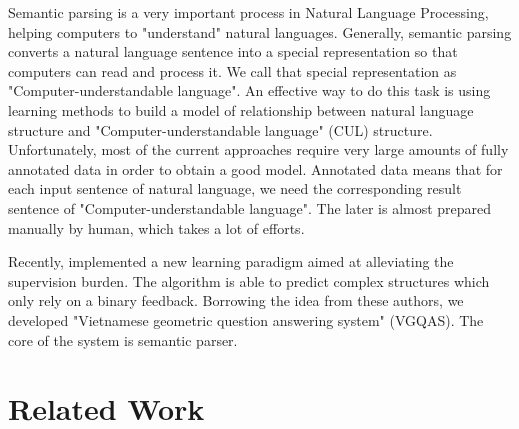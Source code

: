 \label{sec:introduction}

Semantic parsing is a very important process in Natural Language Processing, helping computers to "understand" natural languages. Generally, semantic parsing converts a natural language sentence into a special representation so that computers can read and process it. We call that special representation as "Computer-understandable language". An effective way to do this task is using learning methods to build a model of relationship between natural language structure and "Computer-understandable language" (CUL) structure. Unfortunately, most of the current approaches require very large amounts of fully annotated data in order to obtain a good model. Annotated data means that for each input sentence of natural language, we need the corresponding result sentence of "Computer-understandable language". The later is almost prepared manually by human, which takes a lot of efforts. 

Recently, \citeauthor{Clarke:2010:DSP:1870568.1870571} implemented a new learning paradigm aimed at alleviating the supervision burden. The algorithm is able to predict complex structures which only rely on a binary feedback. Borrowing the idea from these authors, we developed "Vietnamese geometric question answering system" (VGQAS). The core of the system is semantic parser.

\section*{Related Work}
